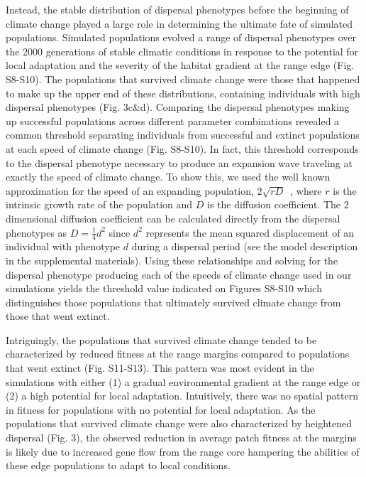 \documentclass[12pt, oneside]{article}
\begin{document}
Instead, the stable distribution of dispersal phenotypes before the beginning of climate change played a large role in determining the ultimate fate of simulated populations. Simulated populations evolved a range of dispersal phenotypes over the $2000$ generations of stable climatic conditions in response to the potential for local adaptation and the severity of the habitat gradient at the range edge (Fig. S8-S10). The populations that survived climate change were those that happened to make up the upper end of these distributions, containing individuals with high dispersal phenotypes (Fig. 3c\&d). Comparing the dispersal phenotypes making up successful populations across different parameter combinations revealed a common threshold separating individuals from successful and extinct populations at each speed of climate change (Fig. S8-S10). In fact, this threshold corresponds to the dispersal phenotype necessary to produce an expansion wave traveling at exactly the speed of climate change. To show this, we used the well known approximation for the speed of an expanding population, $2\sqrt{rD}$~\citep{hastings2005spatial}, where $r$ is the intrinsic growth rate of the population and $D$ is the diffusion coefficient. The $2$ dimensional diffusion coefficient can be calculated directly from the dispersal phenotypes as $D=\frac{1}{4}d^{2}$ since $d^{2}$ represents the mean squared displacement of an individual with phenotype $d$ during a dispersal period (see the model description in the supplemental materials). Using these relationships and solving for the dispersal phenotype producing each of the speeds of climate change used in our simulations yields the threshold value indicated on Figures S8-S10 which distinguishes those populations that ultimately survived climate change from those that went extinct. 

Intriguingly, the populations that survived climate change tended to be characterized by reduced fitness at the range margins compared to populations that went extinct (Fig. S11-S13). This pattern was most evident in the simulations with either (1) a gradual environmental gradient at the range edge or (2) a high potential for local adaptation. Intuitively, there was no spatial pattern in fitness for populations with no potential for local adaptation. As the populations that survived climate change were also characterized by heightened dispersal (Fig. 3), the observed reduction in average patch fitness at the margins is likely due to increased gene flow from the range core hampering the abilities of these edge populations to adapt to local conditions.
\end{document}
